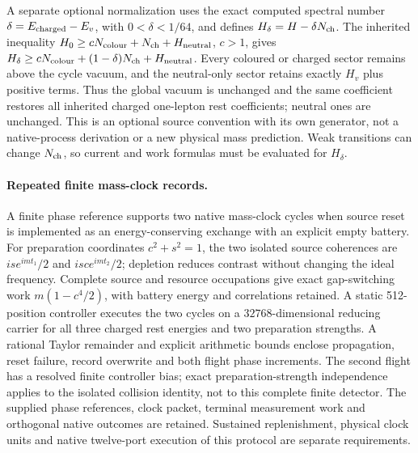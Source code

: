 A separate optional normalization uses the exact computed spectral number
$\delta=E_{\rm charged}-E_v$, with $0<\delta<1/64$, and defines
$H_\delta=H-\delta N_{\rm ch}$. The inherited inequality
$H_0\ge cN_{\rm colour}+N_{\rm ch}+H_{\rm neutral}$, $c>1$, gives
$H_\delta\ge cN_{\rm colour}+(1-\delta)N_{\rm ch}+H_{\rm neutral}$.
Every coloured or charged sector remains above the cycle vacuum, and
the neutral-only sector retains exactly $H_v$ plus positive terms.
Thus the global vacuum is unchanged and the same coefficient restores
all inherited charged one-lepton rest coefficients; neutral ones are
unchanged. This is an optional source convention with its own generator,
not a native-process derivation or a new physical mass prediction.
Weak transitions can change $N_{\rm ch}$, so current and work formulas
must be evaluated for $H_\delta$.

\paragraph{Repeated finite mass-clock records.}
A finite phase reference supports two native mass-clock cycles when source reset is
implemented as an energy-conserving exchange with an explicit empty battery.
For preparation coordinates $c^2+s^2=1$, the two isolated source coherences
are $is e^{imt_1}/2$ and $isc e^{imt_2}/2$; depletion reduces contrast without
changing the ideal frequency. Complete source and resource occupations give
exact gap-switching work $m(1-c^4/2)$, with battery energy and correlations
retained. A static 512-position controller executes the two cycles on a
$32768$-dimensional reducing carrier for all three charged rest energies and
two preparation strengths. A rational Taylor remainder and explicit arithmetic
bounds enclose propagation, reset failure, record overwrite and both flight
phase increments. The second flight has a resolved finite controller bias;
exact preparation-strength independence applies to the isolated collision
identity, not to this complete finite detector. The supplied phase references,
clock packet, terminal measurement work and orthogonal native outcomes are
retained. Sustained replenishment, physical clock units and native twelve-port
execution of this protocol are separate requirements.


